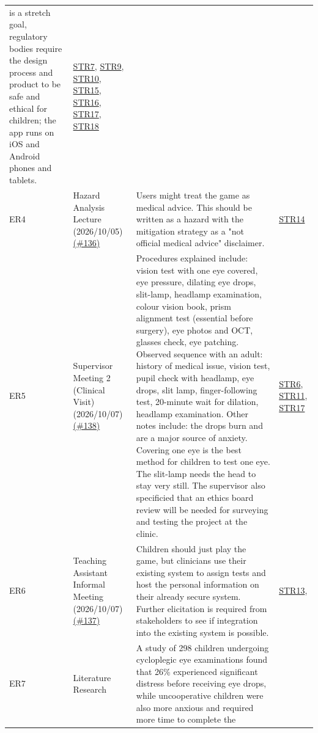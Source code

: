 \documentclass[12pt]{article}
\begin{document}
\begin{longtable}{p{} >{\raggedright\arraybackslash}p{} >{\raggedright\arraybackslash}p{} >{\raggedright\arraybackslash}p{}}
is a stretch goal, regulatory bodies require the design process and product 
to be safe and ethical for children; the app runs on iOS and Android phones 
and tablets.
& \hyperref[SR_Label7]{STR7}, \hyperref[SR_Label9]{STR9}, \hyperref[SR_Label10]{STR10}, 
\hyperref[SR_Label15]{STR15}, \hyperref[SR_Label16]{STR16}, \hyperref[SR_Label17]{STR17}, 
\hyperref[SR_Label18]{STR18} \\
ER4\label{ER4}
& Hazard Analysis Lecture (2026/10/05) \href{https://github.com/team-hindsight/ophthamology-game/issues/136}{(\#136)}
& Users might treat the game as medical
advice. This should be written as a hazard with the mitigation strategy as a 
"not official medical advice" disclaimer.
& \hyperref[SR_Label14]{STR14} \\
ER5\label{ER5}
& Supervisor Meeting 2 (Clinical Visit) (2026/10/07) \href{https://github.com/team-hindsight/ophthamology-game/issues/138}{(\#138)}
& Procedures explained include: vision test with one eye covered, eye pressure, 
dilating eye drops, slit-lamp, headlamp examination, colour vision book, prism 
alignment test (essential before surgery), eye photos and OCT, glasses check, eye 
patching. Observed sequence with an adult: history of medical issue, vision test,
pupil check with headlamp, eye drops, slit lamp, finger-following test, 20-minute
wait for dilation, headlamp examination. Other notes include: the drops burn and 
are a major source of anxiety. Covering one eye is the best method for children 
to test one eye. The slit-lamp needs the head to stay very still. The supervisor 
also specificied that an ethics board review will be needed for surveying and 
testing the project at the clinic.
& \hyperref[SR_Label6]{STR6}, \hyperref[SR_Label11]{STR11}, \hyperref[SR_Label17]{STR17} \\
ER6\label{ER6}
& Teaching Assistant Informal Meeting (2026/10/07) \href{https://github.com/team-hindsight/ophthamology-game/issues/137}{(\#137)}
& Children should just play the game, but clinicians use their existing system 
to assign tests and host the personal information on their already secure system.
Further elicitation is required from stakeholders to see if integration into 
the existing system is possible.
& \hyperref[SR_Label13]{STR13},  \\
ER7\label{ER7}
& Literature Research
& A study of 298 children undergoing cycloplegic eye examinations found that 26\% 
experienced significant distress before receiving eye drops, while uncooperative 
children were also more anxious and required more time to complete the 

\end{longtable}
\end{document}
